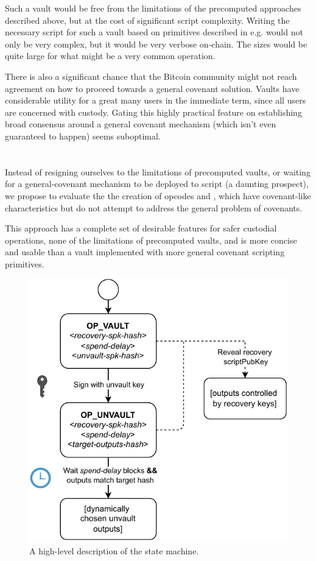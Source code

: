 \documentclass[10pt]{article}
\begin{document}
Such a vault would be free from the limitations of the precomputed approaches described
above, but at the cost of significant script complexity. Writing the necessary script
for such a vault based on primitives described in e.g. \cite{ElementsScript} would not
only be very complex, but it would be very verbose on-chain. The \spk{} sizes would be
quite large for what might be a very common operation.

There is also a significant chance that the Bitcoin community might not reach agreement
on how to proceed towards a general covenant solution. Vaults have considerable utility
for a great many users in the immediate term, since all users are concerned
with custody. Gating this highly practical feature on establishing broad consensus
around a general covenant mechanism (which isn't even guaranteed to happen) seems
suboptimal.

\section*{\opv{}}

Instead of resigning ourselves to the limitations of precomputed vaults, or waiting for
a general-covenant mechanism to be deployed to script (a daunting prospect), we propose
to evaluate the the creation of opcodes \opv{} and \opuv{}, which have covenant-like
characteristics but do not attempt to address the general problem of covenants.

This approach has a complete set of desirable features for safer custodial operations,
none of the limitations of precomputed vaults, and is more concise and usable than a
vault implemented with more general covenant scripting primitives.

\begin{figure}[H]
  \includegraphics[width=0.5\linewidth]{op-vault.pdf}
  \centering
  \caption{A high-level description of the \opv{} state machine.}
\end{figure}
\end{document}
